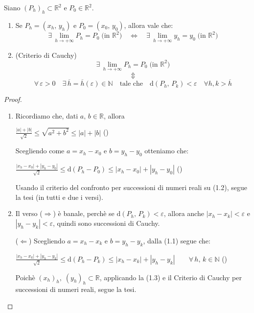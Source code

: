 \begin{thm}
Siano $(P_h)_h \subset \mathbb{R}^2$ e $P_0 \in \mathbb{R}^2$.
\begin{enumerate}[labelindent=\parindent,leftmargin=*,label=\textnormal{(\roman*)},start=1]
\item Se $P_h=(x_h,\, y_h)$ e $P_0=(x_0,\, y_0)$, allora vale che:
$$\exists \, \lim_{h \rightarrow +\infty} P_h = P_0 \; \text{(in } \mathbb{R}^2\text{)} \quad \Longleftrightarrow \quad \exists \, \lim_{h \rightarrow +\infty} y_h = y_0 \; \text{(in } \mathbb{R}^2\text{)}$$
\item (Criterio di Cauchy)
$$\exists \, \lim_{h \rightarrow +\infty} P_h = P_0 \; \text{(in } \mathbb{R}^2\text{)}$$
$$\Updownarrow$$
$$\forall \, \varepsilon > 0 \quad \exists \, \overline{h}=\overline{h}(\varepsilon) \in \mathbb{N} \quad \text{tale che} \quad \mathrm{d}(P_h,\, P_k) < \varepsilon \quad \forall h,k > \overline{h}$$
\end{enumerate}
\end{thm}
\begin{proof}
\mbox{}
\begin{enumerate}[labelindent=\parindent,leftmargin=*,label=\textnormal{(\roman*)},start=1]
\item Ricordiamo che, dati $a,\, b \in \mathbb{R}$, allora
\begin{center}
\hfill
$\displaystyle \frac{|a|+|b|}{\sqrt{2}} \leq \sqrt{a^2+b^2} \leq |a|+|b|$
\hfill{}\textnormal{(\theequation)}
\end{center}
Scegliendo come $a=x_h-x_0$ e $b=y_h-y_0$ otteniamo che:
\begin{center}
\hfill
$\displaystyle \frac{|x_h-x_0|+|y_h-y_0|}{\sqrt{2}} \leq \mathrm{d}(P_h-P_0) \leq |x_h-x_0|+|y_h-y_0|$
\hfill{}\textnormal{(\theequation)}
\end{center}

Usando il criterio del confronto per successioni di numeri reali su \textnormal{(1.2)}, segue la tesi (in tutti e due i versi).

\item Il verso \textnormal{(}$\Rightarrow$\textnormal{)} è banale, perchè se $\mathrm{d}(P_h,\, P_k) < \varepsilon$, allora anche $|x_h-x_k| < \varepsilon$ e $|y_h-y_k| < \varepsilon$, quindi sono successioni di Cauchy.

\textnormal{(}$\Leftarrow$\textnormal{)} Scegliendo $a=x_h-x_k$ e $b=y_h-y_k$, dalla \textnormal{(1.1)} segue che:
\begin{center}
\hfill
$\displaystyle \frac{|x_h-x_k|+|y_h-y_k|}{\sqrt{2}} \leq \mathrm{d}(P_h-P_k) \leq |x_h-x_k|+|y_h-y_k| \qquad \forall \, h,\, k \in \mathbb{N}$
\hfill{}\textnormal{(\theequation)}
\end{center}
Poichè $(x_h)_h,\; (y_h)_h \subset \mathbb{R}$, applicando la \textnormal{(1.3)} e il Criterio di Cauchy per successioni di numeri reali, segue la tesi.

\end{enumerate}
\end{proof}

